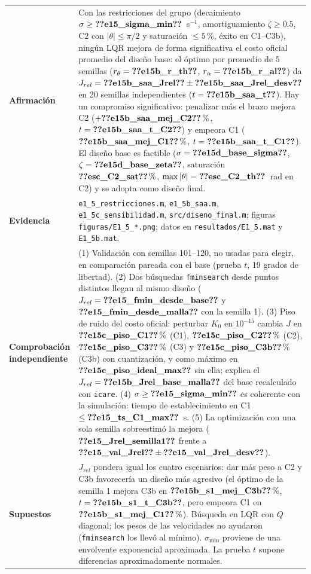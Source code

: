 \begin{recuadro}[title=Ficha de evidencia — E1.5: optimización de los pesos con restricciones]
\begin{tabularx}{\linewidth}{@{}>{\bfseries}p{3.1cm} >{\raggedright\arraybackslash}X@{}}
Afirmación &
Con las restricciones del grupo (decaimiento $\sigma\ge\V{e15_sigma_min}$~s$^{-1}$, amortiguamiento $\zeta\ge0.5$, C2 con
$|\theta|\le\pi/2$ y saturación $\le5\,\%$, éxito en C1--C3b), ningún LQR mejora de forma significativa el
costo oficial promedio del diseño base: el óptimo por promedio de 5 semillas ($r_\theta=\V{e15b_r_th}$,
$r_\alpha=\V{e15b_r_al}$) da $J_{rel}=\V{e15b_saa_Jrel}\pm\V{e15b_saa_Jrel_desv}$ en 20 semillas independientes
($t=\V{e15b_saa_t}$). Hay un compromiso significativo: penalizar más el brazo mejora C2 ($+\V{e15b_saa_mej_C2}\,\%$,
$t=\V{e15b_saa_t_C2}$) y empeora C1 ($\V{e15b_saa_mej_C1}\,\%$, $t=\V{e15b_saa_t_C1}$). El diseño base es factible
($\sigma=\V{e15d_base_sigma}$, $\zeta=\V{e15d_base_zeta}$, saturación $\V{esc_C2_sat}\,\%$, $\max|\theta|=\V{esc_C2_th}$~rad en C2)
y se adopta como diseño final. \\[3pt]
Evidencia &
\texttt{e1\_5\_restricciones.m}, \texttt{e1\_5b\_saa.m}, \texttt{e1\_5c\_sensibilidad.m}, \texttt{src/diseno\_final.m};
figuras \texttt{figuras/E1\_5\_*.png}; datos en \texttt{resultados/E1\_5.mat} y \texttt{E1\_5b.mat}. \\[3pt]
Comprobación independiente &
(1) Validación con semillas 101--120, no usadas para elegir, en comparación pareada con el base (prueba
$t$, 19 grados de libertad).
(2) Dos búsquedas \texttt{fminsearch} desde puntos distintos llegan al mismo diseño ($J_{rel}=\V{e15_fmin_desde_base}$ y
$\V{e15_fmin_desde_malla}$ con la semilla 1).
(3) Piso de ruido del costo oficial: perturbar $K_0$ en $10^{-15}$ cambia $J$ en $\V{e15c_piso_C1}\,\%$ (C1),
$\V{e15c_piso_C2}\,\%$ (C2), $\V{e15c_piso_C3}\,\%$ (C3) y $\V{e15c_piso_C3b}\,\%$ (C3b) con cuantización, y como máximo en
$\V{e15c_piso_ideal_max}$ sin ella; explica el $J_{rel}=\V{e15b_Jrel_base_malla}$ del base recalculado con \texttt{icare}.
(4) $\sigma\ge\V{e15_sigma_min}$ es coherente con la simulación: tiempo de establecimiento en C1 $\le\V{e15_ts_C1_max}$~s.
(5) La optimización con una sola semilla sobreestimó la mejora ($\V{e15_Jrel_semilla1}$ frente a
$\V{e15_val_Jrel}\pm\V{e15_val_Jrel_desv}$). \\[3pt]
Supuestos &
$J_{rel}$ pondera igual los cuatro escenarios: dar más peso a C2 y C3b favorecería un diseño más agresivo
(el óptimo de la semilla 1 mejora C3b en $\V{e15b_s1_mej_C3b}\,\%$, $t=\V{e15b_s1_t_C3b}$, pero empeora C1 en
$\V{e15b_s1_mej_C1}\,\%$). Búsqueda en LQR con $Q$ diagonal; los pesos de las velocidades no ayudaron (\texttt{fminsearch}
los llevó al mínimo). $\sigma_{\min}$ proviene de una envolvente exponencial aproximada. La prueba $t$ supone
diferencias aproximadamente normales.
\end{tabularx}
\end{recuadro}

